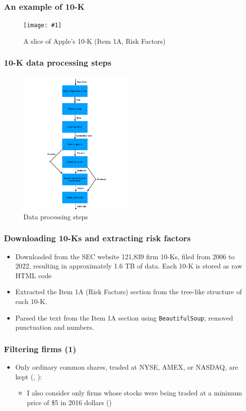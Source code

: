 \documentclass{beamer}
\newcommand{\insertfigurenoffo}[3]{
\begin{figure}[h!]
  \centering
  \texttt{[image: \#1]}
  \caption{#2}
  \label{fig:#1}
\end{figure}
}
\begin{document}
\begin{frame}
  \frametitle{An example of 10-K}
\insertfigurenoffo{apples_1a}{A slice of Apple's 10-K (Item 1A, Risk Factors)}{0.8}
\end{frame}

\begin{frame}
\frametitle{10-K data processing steps}
\begin{figure}[h!]
  \centering
  \includegraphics[width=0.5\textwidth]{data_steps.pdf}
  \caption{Data processing steps}
  \label{data_steps}
\end{figure}
\end{frame}

\begin{frame}
\frametitle{Downloading 10-Ks and extracting risk factors}
\begin{itemize}
\item Downloaded from the SEC website 121,839 firm 10-Ks, filed from 2006 to 2022, resulting in approximately 1.6 TB of data. Each 10-K is stored as raw HTML code
\item Extracted the Item 1A (Risk Factors) section from the tree-like structure of each 10-K.
\item Parsed the text from the Item 1A section using \texttt{BeautifulSoup}; removed punctuation and numbers.
\end{itemize}
\end{frame}


\begin{frame}
\frametitle{Filtering firms (1)}
\begin{itemize}
\item Only ordinary common shares, traded at NYSE, AMEX, or NASDAQ, are kept (\cite{Stambaugh2016-eb}, \cite{Golubov2019-ku}):
\begin{itemize}
  \item I also consider only firms whose stocks were being traded at a minimum price of \$5 in 2016 dollars (\cite{Stambaugh2016-eb})
\end{itemize}
\end{itemize}
\end{frame}
\end{document}
